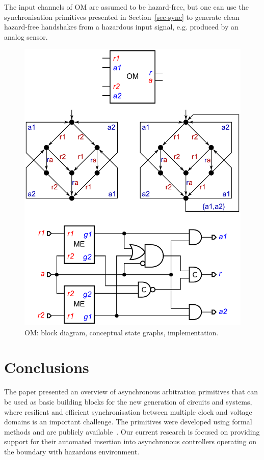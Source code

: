\documentclass[conference]{IEEEtran}
\begin{document}
The input channels of \textsf{OM} are assumed to be hazard-free, but one can use the
synchronisation primitives presented in Section~\ref{sec-sync} to generate clean hazard-free
handshakes from a hazardous input signal, e.g. produced by an analog sensor.

\begin{figure}
\begin{center}
    \vspace{-1mm}
    \includegraphics[scale=0.32]{fig/OM.pdf}
    \caption{\textsf{OM}: block diagram, conceptual state graphs,
    implementation.}
    \label{fig:om}
    \vspace{-6.5mm}
\end{center}
\end{figure}

\section{Conclusions}

The paper presented an overview of asynchronous arbitration primitives that can
be used as basic building blocks for the new generation of circuits and systems,
where resilient and efficient synchronisation between multiple clock and voltage
domains is an important challenge.
The primitives were developed using formal methods and are publicly
available~\cite{Arbitration_primitives_github}. Our current research is focused
on providing support for their automated insertion into asynchronous controllers
operating on the boundary with hazardous environment.
\end{document}
